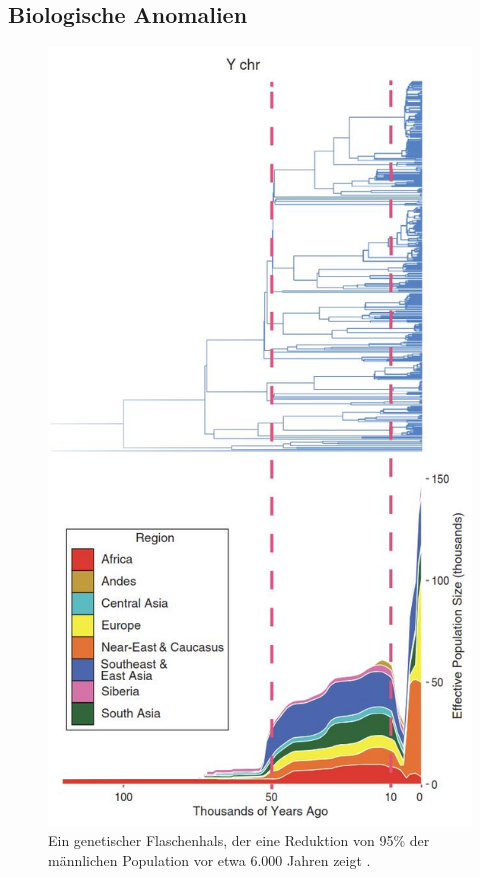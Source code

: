 \documentclass[10pt,twocolumn,letterpaper]{article}
\begin{document}
\subsection{Biologische Anomalien}
\begin{figure}[b]
\begin{center}
   \includegraphics[width=1\linewidth]{bottleneck.jpg}
\end{center}
   \caption{Ein genetischer Flaschenhals, der eine Reduktion von 95\% der männlichen Population vor etwa 6.000 Jahren zeigt \cite{62}.}
\label{fig:10}
\label{fig:onecol}
\end{figure}
\end{document}
